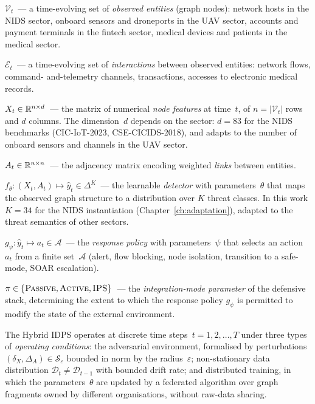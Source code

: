 \noindent\textbf{$\mathcal{V}_t$}~--- a time-evolving set of
\emph{observed entities} (graph nodes): network hosts in the NIDS
sector, onboard sensors and droneports in the UAV sector, accounts
and payment terminals in the fintech sector, medical devices and
patients in the medical sector.

\noindent\textbf{$\mathcal{E}_t$}~--- a time-evolving set of
\emph{interactions} between observed entities: network flows, command-
and-telemetry channels, transactions, accesses to electronic medical
records.

\noindent\textbf{$X_t \in \mathbb{R}^{n\times d}$}~--- the matrix of numerical
\emph{node features} at time~$t$, of $n=|\mathcal{V}_t|$ rows and
$d$ columns. The dimension~$d$ depends on the sector: $d=83$ for the
NIDS benchmarks (CIC-IoT-2023, CSE-CICIDS-2018), and adapts to the
number of onboard sensors and channels in the UAV sector.

\noindent\textbf{$A_t \in \mathbb{R}^{n\times n}$}~--- the adjacency matrix
encoding weighted \emph{links} between entities.

\noindent\textbf{$f_\theta: (X_t, A_t) \mapsto \hat{y}_t \in \Delta^K$}~---
the learnable \emph{detector} with parameters~$\theta$ that maps the
observed graph structure to a distribution over $K$ threat classes.
In this work $K=34$ for the NIDS instantiation
(Chapter~\ref{ch:adaptation}), adapted to the threat semantics of
other sectors.

\noindent\textbf{$g_\psi: \hat{y}_t \mapsto a_t \in \mathcal{A}$}~---
the \emph{response policy} with parameters~$\psi$ that selects an
action $a_t$ from a finite set~$\mathcal{A}$ (alert, flow blocking,
node isolation, transition to a safe-mode, SOAR escalation).

\noindent\textbf{$\pi \in \{\textsc{Passive}, \textsc{Active},
\textsc{IPS}\}$}~--- the \emph{integration-mode parameter} of the
defensive stack, determining the extent to which the response
policy $g_\psi$ is permitted to modify the state of the external
environment.

The Hybrid IDPS operates at discrete time steps~$t=1,2,\dots,T$
under three types of \emph{operating conditions}: the adversarial
environment, formalised by perturbations $(\delta_X, \Delta_A) \in
\mathcal{S}_\varepsilon$ bounded in norm by the radius~$\varepsilon$;
non-stationary data distribution $\mathcal{D}_t \neq \mathcal{D}_{t-1}$
with bounded drift rate; and distributed training, in which the
parameters~$\theta$ are updated by a federated algorithm over graph
fragments owned by different organisations, without raw-data
sharing.

